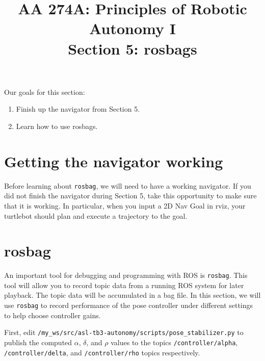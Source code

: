 \documentclass{article}
\title{AA 274A: Principles of Robotic Autonomy I \\Section 5: rosbags}
\date{}
\begin{document}
\maketitle
\pagestyle{fancy}
\vspace{-1.25cm}
Our goals for this section: 
\begin{enumerate}
    \item Finish up the navigator from Section 5.
    \item Learn how to use rosbags.
\end{enumerate}


\section{Getting the navigator working}
Before learning about \texttt{rosbag}, we will need to have a working navigator. If you did not finish the navigator during Section 5, take this opportunity to make sure that it is working. In particular, when you input a 2D Nav Goal in rviz, your turtlebot should plan and execute a trajectory to the goal.

\section{rosbag}
An important tool for debugging and programming with ROS is \texttt{rosbag}. This tool will allow you to record topic data from a running ROS system for later playback. The topic data will be accumulated in a bag file. In this section, we will use \texttt{rosbag} to record performance of the pose controller under different settings to help choose controller gains.

First, edit 
\texttt{/my\_ws/src/asl-tb3-autonomy/scripts/pose\_stabilizer.py}
to publish the computed $\alpha$, $\delta$, and $\rho$ values to the topics \texttt{/controller/alpha}, \texttt{/controller/delta}, and \texttt{/controller/rho} topics respectively. 
\end{document}
